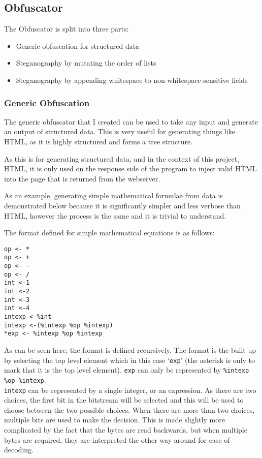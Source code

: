 \subsection{Obfuscator}
The Obfuscator is split into three parts:
\begin{itemize}
    \item Generic obfuscation for structured data
    \item Steganography by mutating the order of lists
    \item Steganography by appending whitespace to non-whitespace-sensitive fields
\end{itemize}

\subsubsection{Generic Obfuscation}
The generic obfuscator that I created can be used to take any input and generate an output of structured data. This is very useful for generating things like HTML, as it is highly structured and forms a tree structure.\par
As this is for generating structured data, and in the context of this project, HTML, it is only used on the response side of the program to inject valid HTML into the page that is returned from the webserver.\par
As an example, generating simple mathematical formulae from data is demonstrated below because it is significantly simpler and less verbose than HTML, however the process is the same and it is trivial to understand.\par
The format defined for simple mathematical equations is as follows:
\begin{verbatim}
op <- *
op <- +
op <- -
op <- /
int <-1
int <-2
int <-3
int <-4
intexp <-%int
intexp <-(%intexp %op %intexp)
*exp <- %intexp %op %intexp
\end{verbatim}
As can be seen here, the format is defined recursively.
The format is the built up by selecting the top level element which in this case `\texttt{exp}' (the asterisk is only to mark that it is the top level element).
\texttt{exp} can only be represented by \texttt{\%intexp \%op \%intexp}. \\
\texttt{intexp} can be represented by a single integer, or an expression.
As there are two choices, the first bit in the bitstream will be selected and this will be used to choose between the two possible choices.
When there are more than two choices, multiple bits are used to make the decision.
This is made slightly more complicated by the fact that the bytes are read backwards, but when multiple bytes are required, they are interpreted the other way around for ease of decoding.

